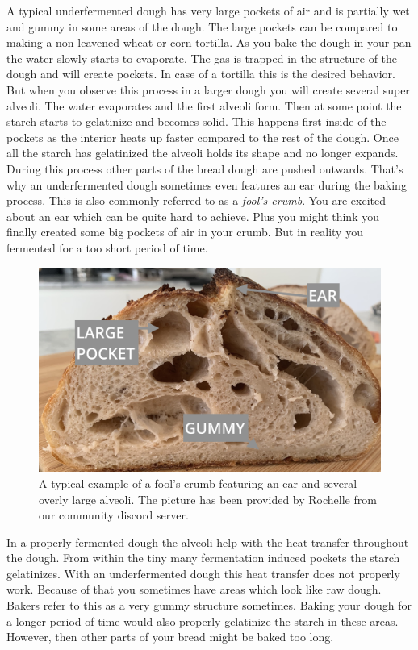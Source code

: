 A typical underfermented dough has very large pockets of air and is partially
wet and gummy in some areas of the dough. The large pockets can be compared
to making a non-leavened wheat or corn tortilla. As you bake the dough in your pan
the water slowly starts to evaporate. The gas is trapped in the structure of the dough
and will create pockets. In case of a tortilla this is the desired behavior.
But when you observe this process in a larger dough you will create several
super alveoli. The water evaporates and the first alveoli form. Then at some point
the starch starts to gelatinize and becomes solid. This happens first inside of the pockets
as the interior heats up faster compared to the rest of the dough. Once all the starch
has gelatinized the alveoli holds its shape and no longer expands. During this
process other parts of the bread dough are pushed outwards. That's why an underfermented
dough sometimes even features an ear during the baking process. This
is also commonly referred to as a {\it fool's crumb}. You are excited about an ear which
can be quite hard to achieve. Plus you might think you finally created some big pockets
of air in your crumb. But in reality you fermented for a too short period
of time.

\begin{figure}
  \includegraphics[width=\textwidth]{fools-crumb}
  \caption{A typical example of a fool's crumb featuring an ear and several overly
  large alveoli. The picture has been provided by Rochelle from our
  community discord server.}
  \label{fools-crumb}
\end{figure}

In a properly fermented dough the alveoli help with the heat transfer throughout the dough.
From within the tiny many fermentation induced pockets the starch gelatinizes. With
an underfermented dough this heat transfer does not properly work. Because of that
you sometimes have areas which look like raw dough. Bakers refer to this as a very
gummy structure sometimes. Baking your dough for a longer period of time would also properly
gelatinize the starch in these areas. However, then other parts of your bread
might be baked too long.

